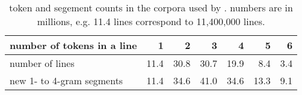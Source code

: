 \begin{table}[t]
 \caption{token and segement counts in the corpora used by \citet{Risvik:2003}. numbers are in millions, e.g. 11.4 lines correspond to 11,400,000 lines.}
 \label{table-token-segments-risvik-2003}
 \centering
 \small
 \begin{tabular}{@{}lrrrrrr@{}}
  \toprule
 number of tokens in a line & 1 & 2 & 3 & 4 & 5 & 6 \\
  \midrule
  number of lines & 11.4 & 30.8 & 30.7 & 19.9 & 8.4 & 3.4  \\
  new 1- to 4-gram segments & 11.4 & 34.6 & 41.0 & 34.6 & 13.3 & 9.1 \\
  \bottomrule
 \end{tabular}
\end{table}
